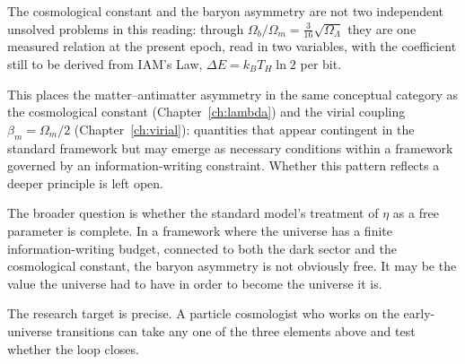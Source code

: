 The cosmological constant and the baryon asymmetry are not two independent unsolved problems in this reading: through
$\Omega_b/\Omega_m=\tfrac3{16}\sqrt{\Omega_\Lambda}$ they are one measured relation at the present epoch, read in two variables, with
the coefficient still to be derived from IAM's Law, $\Delta E=k_BT_H\ln2$ per bit. \observed\ \openprob

This places the matter--antimatter asymmetry in the same conceptual category as the cosmological constant (Chapter~\ref{ch:lambda}) and
the virial coupling $\beta_m=\Omega_m/2$ (Chapter~\ref{ch:virial}): quantities that appear contingent in the standard framework but
may emerge as necessary conditions within a framework governed by an information-writing constraint. Whether this pattern reflects a
deeper principle is left open. \interp

The broader question is whether the standard model's treatment of $\eta$ as a free parameter is complete. In a framework where the
universe has a finite information-writing budget, connected to both the dark sector and the cosmological constant, the baryon asymmetry
is not obviously free. It may be the value the universe had to have in order to become the universe it is. \conjecture

The research target is precise. A particle cosmologist who works on the early-universe transitions can take any one of the three elements above and test whether the loop closes.
